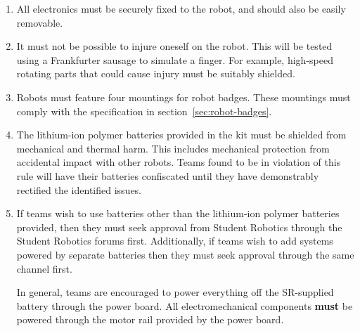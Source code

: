 \begin{enumerate}
\item All electronics must be securely fixed to the robot, and should also be easily removable.

\item It must not be possible to injure oneself on the robot.
 This will be tested using a Frankfurter sausage to simulate a finger.  For example, high-speed rotating parts that could cause injury must be suitably shielded.

\item Robots must feature four mountings for robot badges.  These mountings must comply with the specification in section~\ref{sec:robot-badges}.

\item The lithium-ion polymer batteries provided in the kit must be shielded from mechanical and thermal harm.  This includes mechanical protection from accidental impact with other robots.  Teams found to be in violation of this rule will have their batteries confiscated until they have demonstrably rectified the identified issues.

\item If teams wish to use batteries other than the lithium-ion polymer batteries provided, then they must seek approval from Student Robotics through the Student Robotics forums first.  Additionally, if teams wish to add systems powered by separate batteries then they must seek approval through the same channel first.

 In general, teams are encouraged to power everything off the SR-supplied battery through the power board.
 All electromechanical components \textbf{must} be powered through the motor rail provided by the power board.


\end{enumerate}

